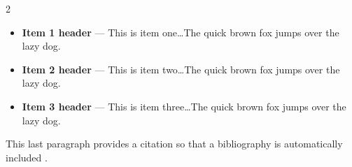 \documentclass[11pt]{article}%
\begin{document}
\begin{multicols}{2}
\begin{itemize}
\item {\bf Item 1 header} --- This is item one\dots The quick brown fox jumps
over the lazy dog.
\item {\bf Item 2 header} --- This is item two\dots The quick brown fox jumps
over the lazy dog.
\item {\bf Item 3 header} --- This is item three\dots The quick brown fox jumps
over the lazy dog.
\end{itemize}

This last paragraph provides a citation so that a bibliography is
automatically included \parencite{book:algorithms-4th-ed}.

\printbibliography %


\end{multicols}
\end{document}
